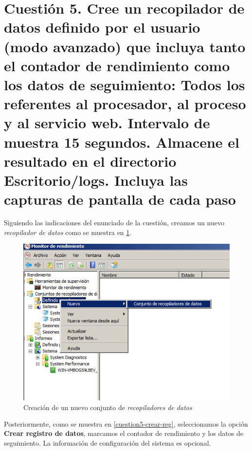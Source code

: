 \section{Cuestión 5. Cree un recopilador de datos definido por el usuario (modo avanzado) que incluya tanto el contador de rendimiento como los datos de seguimiento: Todos los referentes al procesador, al proceso y al servicio web. Intervalo de muestra 15 segundos. Almacene el resultado en el directorio Escritorio/logs. Incluya las capturas de pantalla de cada paso}

Siguiendo las indicaciones del enunciado de la cuestión, creamos un nuevo \textit{recopilador de datos} como se muestra en \ref{cuestion5-nuevoreco}.

\begin{figure}[H]
	\centering
	\includegraphics[scale=0.6]{cuestion5-nuevoreco.png}
	\caption{Creación de un nuevo conjunto de \textit{recopiladores de datos}} \label{cuestion5-nuevoreco}
\end{figure}

Posteriormente, como se muestra en \ref{cuestion5-crear-reg}, seleccionamos la opción \textbf{Crear registro de datos}, marcamos el contador de rendimiento y los datos de seguimiento. La información de configuración del sistema es opcional.

